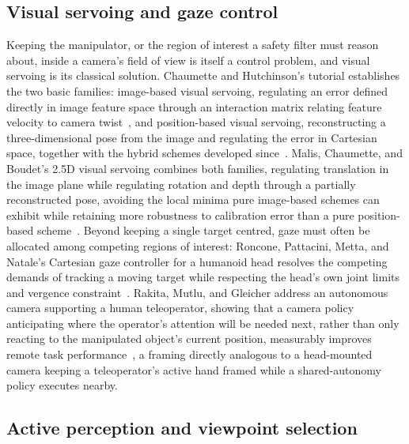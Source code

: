 \documentclass[12pt,a4paper,twoside,openright]{report}
\begin{document}
\subsection{Visual servoing and gaze control}
\label{sec:sota-visual-servoing}

Keeping the manipulator, or the region of interest a safety filter must reason about, inside a camera's field of view is itself a control problem, and visual servoing is its classical solution. Chaumette and Hutchinson's tutorial establishes the two basic families: image-based visual servoing, regulating an error defined directly in image feature space through an interaction matrix relating feature velocity to camera twist~\cite{chaumette2006}, and position-based visual servoing, reconstructing a three-dimensional pose from the image and regulating the error in Cartesian space, together with the hybrid schemes developed since~\cite{chaumette2007advanced}. Malis, Chaumette, and Boudet's 2.5D visual servoing combines both families, regulating translation in the image plane while regulating rotation and depth through a partially reconstructed pose, avoiding the local minima pure image-based schemes can exhibit while retaining more robustness to calibration error than a pure position-based scheme~\cite{malis1999}. Beyond keeping a single target centred, gaze must often be allocated among competing regions of interest: Roncone, Pattacini, Metta, and Natale's Cartesian gaze controller for a humanoid head resolves the competing demands of tracking a moving target while respecting the head's own joint limits and vergence constraint~\cite{roncone2016gaze}. Rakita, Mutlu, and Gleicher address an autonomous camera supporting a human teleoperator, showing that a camera policy anticipating where the operator's attention will be needed next, rather than only reacting to the manipulated object's current position, measurably improves remote task performance~\cite{rakita2018autonomouscamera}, a framing directly analogous to a head-mounted camera keeping a teleoperator's active hand framed while a shared-autonomy policy executes nearby.

\subsection{Active perception and viewpoint selection}
\label{sec:sota-active-perception}
\end{document}
